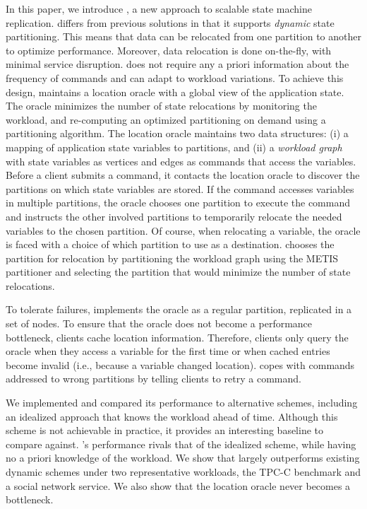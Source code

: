 In this paper, we introduce \dynastar, a new approach to scalable state machine replication.
\dynastar differs from previous solutions in that it supports \emph{dynamic} state partitioning.
This means that data can be relocated from one partition to another to optimize performance.
Moreover, data relocation is done on-the-fly, with minimal service disruption.
\dynastar does not require any a priori information about the frequency of commands and can adapt to workload variations.
To achieve this design, \dynastar maintains a
location oracle with a global view of the application state.  The oracle minimizes the
number of state relocations by monitoring the workload, and
re-computing an optimized partitioning on demand using a 
partitioning algorithm.  
The location oracle maintains two data structures: (i) a mapping of application state variables to partitions, and (ii) a \emph{workload graph} with state variables as vertices and edges as commands that access the variables.  
Before a client submits a command, it contacts the
location oracle to discover the partitions on which state variables are
stored.  If the command accesses variables in multiple partitions, the
oracle chooses one partition to execute the command and instructs the other involved partitions to temporarily relocate 
the needed variables to the chosen partition. Of course, when relocating a variable, the oracle
is faced with a choice of which partition to use as a destination.
\dynastar chooses the partition for relocation by partitioning the
workload graph using the METIS~\cite{Abou-Rjeili:2006} partitioner and selecting the partition that 
would minimize the number of state relocations.

To tolerate failures, \dynastar implements the oracle as a regular partition, replicated in a set of nodes.
To ensure that the oracle does not become a performance bottleneck, clients cache location information.
Therefore, clients only query the oracle when they access a variable for the first time or when cached entries become invalid (i.e., because a variable changed location).
\dynastar copes with commands addressed to wrong partitions by telling clients to retry a command.

We implemented \dynastar and compared its performance to
alternative schemes, including an idealized approach that knows the workload ahead of time.
Although this scheme is not achievable in practice, it provides an interesting baseline to compare against.
\dynastar's performance rivals that of the idealized scheme, while having no a priori knowledge of the workload.
We show that \dynastar largely outperforms existing dynamic schemes under two representative workloads, the TPC-C benchmark and a social network service.
We also show that the location oracle never becomes a bottleneck.

